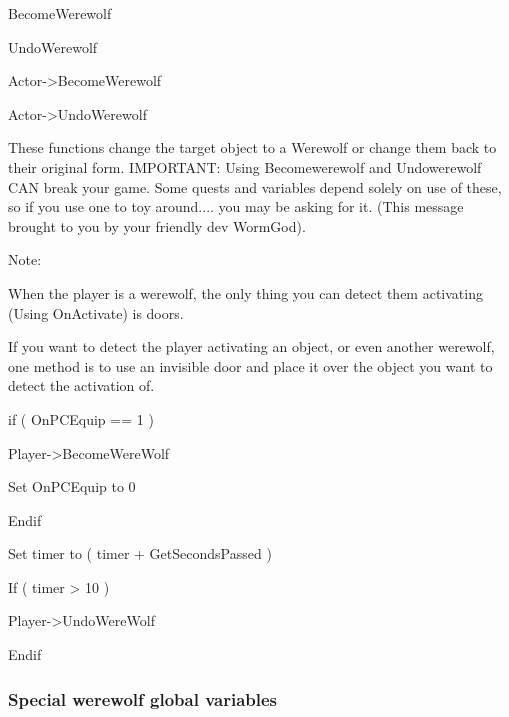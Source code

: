 BecomeWerewolf

UndoWerewolf

Actor-\textgreater BecomeWerewolf

Actor-\textgreater UndoWerewolf

These functions change the target object to a Werewolf or change them
back to their original form. IMPORTANT: Using Becomewerewolf and
Undowerewolf CAN break your game. Some quests and variables depend
solely on use of these, so if you use one to toy around.... you may be
asking for it. (This message brought to you by your friendly dev
WormGod).

Note:

When the player is a werewolf, the only thing you can detect them
activating (Using OnActivate) is doors.

If you want to detect the player activating an object, or even another
werewolf, one method is to use an invisible door and place it over the
object you want to detect the activation of.

if ( OnPCEquip == 1 )

Player-\textgreater BecomeWereWolf

Set OnPCEquip to 0

Endif

Set timer to ( timer + GetSecondsPassed )

If ( timer \textgreater{} 10 )

Player-\textgreater UndoWereWolf

Endif

\hypertarget{section-8}{%
\subsubsection{}\label{section-8}}

\hypertarget{section-9}{%
\subsubsection{}\label{section-9}}

\hypertarget{section-10}{%
\subsubsection{}\label{section-10}}

\hypertarget{special-werewolf-global-variables}{%
\subsubsection{Special werewolf global
variables}\label{special-werewolf-global-variables}}

